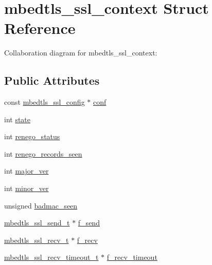 \hypertarget{structmbedtls__ssl__context}{}\section{mbedtls\+\_\+ssl\+\_\+context Struct Reference}
\label{structmbedtls__ssl__context}


Collaboration diagram for mbedtls\+\_\+ssl\+\_\+context\+:
\subsection*{Public Attributes}
\begin{DoxyCompactItemize}
\item 
const \mbox{\hyperlink{structmbedtls__ssl__config}{mbedtls\+\_\+ssl\+\_\+config}} $\ast$ \mbox{\hyperlink{structmbedtls__ssl__context_af91df820bd8e776101c580a89bac9bf7}{conf}}
\item 
int \mbox{\hyperlink{structmbedtls__ssl__context_a32cd4a2bcd224f570b5a350e277ccca3}{state}}
\item 
int \mbox{\hyperlink{structmbedtls__ssl__context_a2d0234b74d1f125e14e1b78a61db2edf}{renego\+\_\+status}}
\item 
int \mbox{\hyperlink{structmbedtls__ssl__context_aa735220d7fc72e44974f70f28fc70814}{renego\+\_\+records\+\_\+seen}}
\item 
int \mbox{\hyperlink{structmbedtls__ssl__context_a149cbf2760485998884d10b530e4580a}{major\+\_\+ver}}
\item 
int \mbox{\hyperlink{structmbedtls__ssl__context_ac68723758d3617fee8ac862931f495b2}{minor\+\_\+ver}}
\item 
unsigned \mbox{\hyperlink{structmbedtls__ssl__context_ade2a10fc444a50b44a2caee1312d5b7e}{badmac\+\_\+seen}}
\item 
\mbox{\hyperlink{ssl_8h_a38e2b400d361f42f85833cdc30b3916e}{mbedtls\+\_\+ssl\+\_\+send\+\_\+t}} $\ast$ \mbox{\hyperlink{structmbedtls__ssl__context_a56c031134adcd848c5fbdab961fe263d}{f\+\_\+send}}
\item 
\mbox{\hyperlink{ssl_8h_ac06b19b96b643090c55f19b6c28b10c4}{mbedtls\+\_\+ssl\+\_\+recv\+\_\+t}} $\ast$ \mbox{\hyperlink{structmbedtls__ssl__context_aa3bb4d87f520cd10d1e84af9d3f0bd86}{f\+\_\+recv}}
\item 
\mbox{\hyperlink{ssl_8h_a6d615ca95c8a67d7c5f9d7d256dc09e6}{mbedtls\+\_\+ssl\+\_\+recv\+\_\+timeout\+\_\+t}} $\ast$ \mbox{\hyperlink{structmbedtls__ssl__context_ab73e4b497e3ed88b3bebad3bada2758b}{f\+\_\+recv\+\_\+timeout}}

\end{DoxyCompactItemize}
